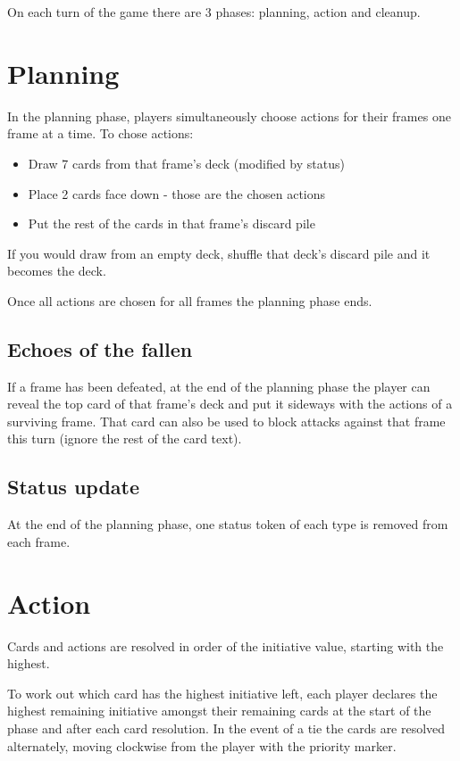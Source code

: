 \documentclass[a4paper, twocolumn]{article}
\begin{document}
On each turn of the game there are 3 phases: planning, action and cleanup. 

\section{Planning}
In the planning phase, players simultaneously choose actions for their frames one frame at a time.
To chose actions:
\begin{itemize}
  \item Draw 7 cards from that frame's deck (modified by status)
  \item Place 2 cards face down - those are the chosen actions
  \item Put the rest of the cards in that frame's discard pile
\end{itemize}
If you would draw from an empty deck, shuffle that deck's discard pile and it becomes the deck.

Once all actions are chosen for all frames the planning phase ends.

\subsection{Echoes of the fallen}
If a frame has been defeated, at the end of the planning phase the player can reveal the top card of that frame's deck and put it sideways with the actions of a surviving frame. That card can also be used to block attacks against that frame this turn (ignore the rest of the card text).

\subsection{Status update}
At the end of the planning phase, one status token of each type is removed from each frame.


\section{Action}
Cards and actions are resolved in order of the initiative value, starting with the highest.

To work out which card has the highest initiative left, each player declares the highest remaining initiative amongst their 
remaining cards at the start of the phase and after each card resolution.
In the event of a tie the cards are resolved alternately, moving clockwise from the player with the priority marker.
\end{document}
